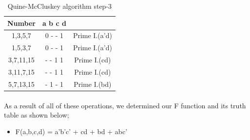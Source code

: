 \documentclass[pdftex,12pt,a4paper]{article}
\begin{document}
\begin{table}[h]
\centering
\begin{tabular}{c|c|c}
Number  & a b c d &      \\ \hline
1,3,5,7     & 0 - - 1 & Prime I.(a'd)   \\ 
1,5,3,7     & 0 - - 1 & Prime I.(a'd)    \\ \hline
3,7,11,15   & - - 1 1 & Prime I.(cd) \\ 
3,11,7,15   & - - 1 1 & Prime I.(cd) \\ 
5,7,13,15   & - 1 - 1 & Prime I.(bd)   \\ 
\end{tabular}
\caption{Quine-McCluskey algorithm step-3}
\label{quine3}
\end{table}
\clearpage

\paragraph{}
As a result of all of these operations, we determined our F function and its truth table as shown below;
\begin{itemize}
    \item  F(a,b,c,d) = a'b'c' + cd + bd + abc'
\end{itemize}
\end{document}

